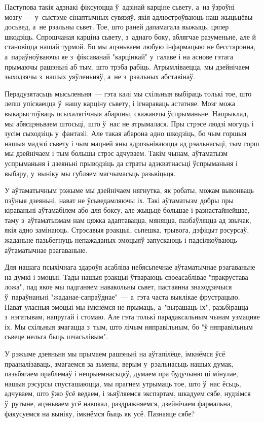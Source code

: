 Паступова такія адзнакі фіксуюцца ў~адзінай карціне сьвету, а~на ўзроўні мозгу~--- у~сыстэме сінаптычных сувязяў, якія адлюстроўваюць наш жыцьцёвы досьвед, а~не рэальны сьвет. Тое, што раней дапамагала выжыць, цяпер шкодзіць. Спрошчаная карціна сьвету, з~аднаго боку, аблягчае разуменьне, але й становіцца нашай турмой. Бо мы ацэньваем любую інфармацыю не бесстаронна, а~параўноўваючы яе з~фіксаванай "карцінкай" у~галаве і на аснове гэтага прымаючы рашэньні аб тым, што трэба рабіць. Атрымліваецца, мы дзейнічаем зыходзячы з~нашых уяўленьняў, а~не з~рэальных абставінаў.

Перадузятасьць мысьленьня~--- гэта калі мы схільныя выбіраць толькі тое, што лепш упісваецца ў~нашу карціну сьвету, і ігнараваць астатняе. Мозг можа выкарыстоўваць псыхалягічныя абароны, скажаючы ўспрыманьне. Напрыклад, мы абясцэньваем штосьці, што ў~нас не атрымалася. Пры стрэсе людзі могуць і зусім сыходзіць у~фантазіі. Але такая абарона адно шкодзіць, бо чым горшыя нашыя мадэлі сьвету і чым мацней яны адрозьніваюцца ад рэальнасьці, тым горш мы дзейнічаем і тым большы стрэс адчуваем. Такім чынам, аўтаматызм успрыманьня і дзеяньні прыводзіць да страты адэкватнасьці ўспрыманьня і выбару, у~выніку мы губляем магчымасьць разьвіцьця.

У аўтаматычным рэжыме мы дзейнічаем нягнутка, як робаты, можам выконваць пэўныя дзеяньні, нават не ўсьведамляючы іх. Такі аўтаматызм добры пры кіраваньні аўтамабілем або для боксу, але жыцьцё большае і разнастайнейшае, таму з~аўтаматызмам нам цяжка адаптавацца, мяняцца, пазбаўляцца ад звычак, якія адно замінаюць. Стрэсавыя рэакцыі, сьпешка, трывога, дэфіцыт рэсурсаў, жаданьне пазьбегнуць непажаданых эмоцыяў запускаюць і падсілкоўваюць аўтаматычнае рэагаваньне.

Для нашага псыхічнага здароўя асабліва небясьпечнае аўтаматычнае рэагаваньне на думкі і эмоцыі. Тады нашыя рэакцыі ўтвараюць своеасаблівае "пракрустава ложа", пад якое мы падганяем навакольны сьвет, пастаянна знаходзячыся ў~параўнаньні "жаданае-сапраўднае"~--- а~гэта часта выклікае фрустрацыю. Нават уласныя эмоцыі мы імкнёмся не прымаць, а~"вырашаць іх", разьбірацца з~нэгатывам, напругай і стомаю. Але гэта толькі парадаксальным чынам узмацняе іх. Мы схільныя змагацца з~тым, што лічым няправільным, бо "ў няправільным сьвеце нельга быць шчасьлівым".

У рэжыме дзеяньня мы прымаем рашэньні на аўтапілёце, імкнёмся ўсё прааналізаваць, змагаемся за зьмены, верым у~рэальнасьць нашых думак, пазьбягаем праблемаў і непрыемнасьцяў, думаем пра будучыню ці мінулае, нашыя рэсурсы спусташаюцца, мы прагнем утрымаць тое, што ў~нас ёсьць, адчуваем, што ўжо ўсё ведаем, і зьяўляемся экспэртам, шкадуем сябе, нудзімся ў~рутыне, ацэньваем усё навокал, раздражняемся, дзейнічаем фармальна, факусуемся на выніку, імкнёмся быць як усё. Пазнаяце сябе?

